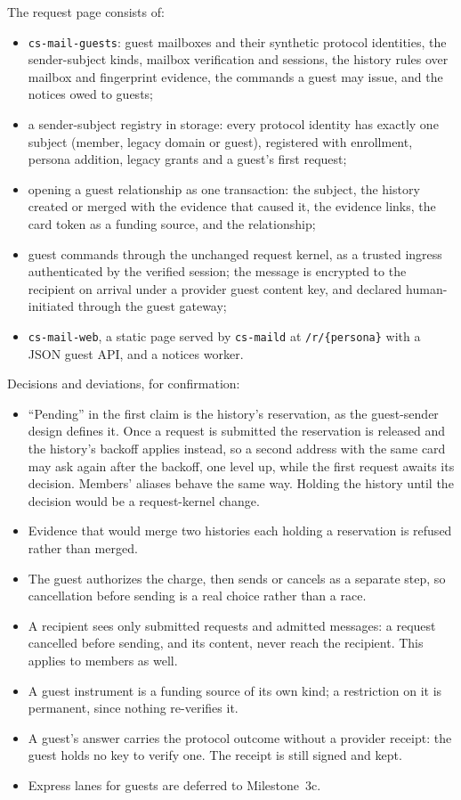 \documentclass[11pt]{article}
\begin{document}
The request page consists of:
\begin{itemize}[nosep]
\item \texttt{cs-mail-guests}: guest mailboxes and their synthetic protocol identities,
  the sender-subject kinds, mailbox verification and sessions, the history rules over
  mailbox and fingerprint evidence, the commands a guest may issue, and the notices
  owed to guests;
\item a sender-subject registry in storage: every protocol identity has exactly one
  subject (member, legacy domain or guest), registered with enrollment, persona
  addition, legacy grants and a guest's first request;
\item opening a guest relationship as one transaction: the subject, the history
  created or merged with the evidence that caused it, the evidence links, the card
  token as a funding source, and the relationship;
\item guest commands through the unchanged request kernel, as a trusted ingress
  authenticated by the verified session; the message is encrypted to the recipient on
  arrival under a provider guest content key, and declared human-initiated through
  the guest gateway;
\item \texttt{cs-mail-web}, a static page served by \texttt{cs-maild} at
  \texttt{/r/\{persona\}} with a JSON guest API, and a notices worker.
\end{itemize}

Decisions and deviations, for confirmation:
\begin{itemize}[nosep]
\item ``Pending'' in the first claim is the history's reservation, as the guest-sender
  design defines it. Once a request is submitted the reservation is released and the
  history's backoff applies instead, so a second address with the same card may ask
  again after the backoff, one level up, while the first request awaits its decision.
  Members' aliases behave the same way. Holding the history until the decision would
  be a request-kernel change.
\item Evidence that would merge two histories each holding a reservation is refused
  rather than merged.
\item The guest authorizes the charge, then sends or cancels as a separate step, so
  cancellation before sending is a real choice rather than a race.
\item A recipient sees only submitted requests and admitted messages: a request
  cancelled before sending, and its content, never reach the recipient. This applies
  to members as well.
\item A guest instrument is a funding source of its own kind; a restriction on it is
  permanent, since nothing re-verifies it.
\item A guest's answer carries the protocol outcome without a provider receipt: the
  guest holds no key to verify one. The receipt is still signed and kept.
\item Express lanes for guests are deferred to Milestone~3c.
\end{itemize}
\end{document}
